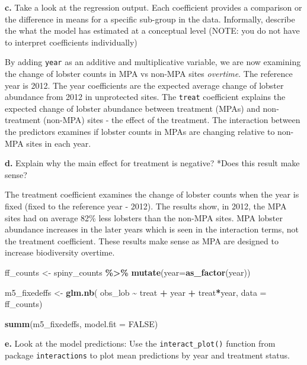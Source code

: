 \documentclass[
]{article}
\newenvironment{Shaded}{\begin{snugshade}}{\end{snugshade}}
\newcommand{\AttributeTok}[1]{\textcolor[rgb]{0.13,0.29,0.53}{#1}}
\newcommand{\ConstantTok}[1]{\textcolor[rgb]{0.56,0.35,0.01}{#1}}
\newcommand{\FunctionTok}[1]{\textcolor[rgb]{0.13,0.29,0.53}{\textbf{#1}}}
\newcommand{\NormalTok}[1]{#1}
\newcommand{\OtherTok}[1]{\textcolor[rgb]{0.56,0.35,0.01}{#1}}
\newcommand{\SpecialCharTok}[1]{\textcolor[rgb]{0.81,0.36,0.00}{\textbf{#1}}}
\begin{document}
\textbf{c.} Take a look at the regression output. Each coefficient
provides a comparison or the difference in means for a specific
sub-group in the data. Informally, describe the what the model has
estimated at a conceptual level (NOTE: you do not have to interpret
coefficients individually)

By adding \texttt{year} as an additive and multiplicative variable, we
are now examining the change of lobster counts in MPA vs non-MPA sites
\emph{overtime}. The reference year is 2012. The year coefficients are
the expected average change of lobster abundance from 2012 in
unprotected sites. The \texttt{treat} coefficient explains the expected
change of lobster abundance between treatment (MPAs) and non-treatment
(non-MPA) sites - the effect of the treatment. The interaction between
the predictors examines if lobster counts in MPAs are changing relative
to non-MPA sites in each year.

\textbf{d.} Explain why the main effect for treatment is negative? *Does
this result make sense?

The treatment coefficient examines the change of lobster counts when the
year is fixed (fixed to the reference year - 2012). The results show, in
2012, the MPA sites had on average 82\% less lobsters than the non-MPA
sites. MPA lobster abundance increases in the later years which is seen
in the interaction terms, not the treatment coefficient. These results
make sense as MPA are designed to increase biodiversity overtime.

\begin{Shaded}
\begin{Highlighting}[]
\NormalTok{ff\_counts }\OtherTok{\textless{}{-}}\NormalTok{ spiny\_counts }\SpecialCharTok{\%\textgreater{}\%} 
    \FunctionTok{mutate}\NormalTok{(}\AttributeTok{year=}\FunctionTok{as\_factor}\NormalTok{(year))}
    
\NormalTok{m5\_fixedeffs }\OtherTok{\textless{}{-}} \FunctionTok{glm.nb}\NormalTok{(}
\NormalTok{    obs\_lob }\SpecialCharTok{\textasciitilde{}} 
\NormalTok{        treat }\SpecialCharTok{+}
\NormalTok{        year }\SpecialCharTok{+}
\NormalTok{        treat}\SpecialCharTok{*}\NormalTok{year,}
    \AttributeTok{data =}\NormalTok{ ff\_counts)}

\FunctionTok{summ}\NormalTok{(m5\_fixedeffs, }\AttributeTok{model.fit =} \ConstantTok{FALSE}\NormalTok{)}
\end{Highlighting}
\end{Shaded}

\textbf{e.} Look at the model predictions: Use the
\texttt{interact\_plot()} function from package \texttt{interactions} to
plot mean predictions by year and treatment status.
\end{document}
